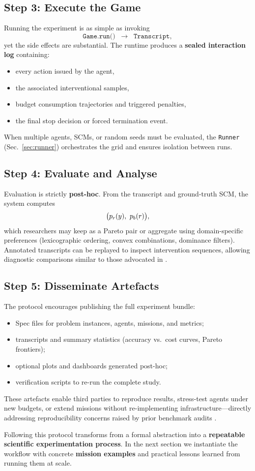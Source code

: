 \subsection{Step 3: Execute the Game}
Running the experiment is as simple as invoking
\[
    \texttt{Game.run()} \;\;\longrightarrow\;\; \texttt{Transcript},
\]
yet the side effects are substantial. The runtime produces a \textbf{sealed interaction log} containing:
\begin{itemize}
    \item every action issued by the agent,
    \item the associated interventional samples,
    \item budget consumption trajectories and triggered penalties,
    \item the final stop decision or forced termination event.
\end{itemize}
When multiple agents, SCMs, or random seeds must be evaluated, the \texttt{Runner} (Sec.~\ref{sec:runner}) orchestrates the grid and ensures isolation between runs.

\subsection{Step 4: Evaluate and Analyse}
Evaluation is strictly \textbf{post-hoc}.  
From the transcript and ground-truth SCM, the system computes
\[
    \big( p_r(y),\ p_b(r) \big),
\]
which researchers may keep as a Pareto pair or aggregate using domain-specific preferences (lexicographic ordering, convex combinations, dominance filters). Annotated transcripts can be replayed to inspect intervention sequences, allowing diagnostic comparisons similar to those advocated in \cite{CausalDiscoveryFramework2024}.

\subsection{Step 5: Disseminate Artefacts}
The protocol encourages publishing the full experiment bundle:
\begin{itemize}
    \item Spec files for problem instances, agents, missions, and metrics;
    \item transcripts and summary statistics (accuracy vs.\ cost curves, Pareto frontiers);
    \item optional plots and dashboards generated post-hoc;
    \item verification scripts to re-run the complete study.
\end{itemize}
These artefacts enable third parties to reproduce results, stress-test agents under new budgets, or extend missions without re-implementing infrastructure—directly addressing reproducibility concerns raised by prior benchmark audits \citep{CIPCaDBench2022,EvaluationFramework2022}.

\medskip
Following this protocol transforms \game from a formal abstraction into a \textbf{repeatable scientific experimentation process}. In the next section we instantiate the workflow with concrete \textbf{mission examples} and practical lessons learned from running them at scale.
